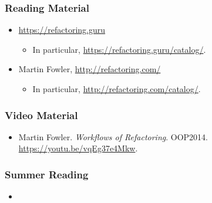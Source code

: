 \begin{frame}

\frametitle{Reading Material}

\footnotesize

\begin{itemize}

\item \url{https://refactoring.guru}

\begin{itemize}

\item In particular, \url{https://refactoring.guru/catalog/}.

\end{itemize}

\item Martin Fowler, \url{http://refactoring.com/}

\begin{itemize}

\item In particular, \url{http://refactoring.com/catalog/}.

\end{itemize}

\end{itemize}

\end{frame}


\begin{frame}

\frametitle{Video Material}

\footnotesize

\begin{itemize}

\item Martin Fowler. \emph{Workflows of Refactoring}. OOP2014.
\url{https://youtu.be/vqEg37e4Mkw}.

%

\end{itemize}

\end{frame}


\begin{frame}

\frametitle{Summer Reading}

\footnotesize

\begin{itemize}

\item

\end{itemize}

\end{frame}
